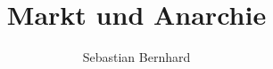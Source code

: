 \documentclass[a4paper]{hitec}
\begin{document}
\author{Sebastian Bernhard}
\title{Markt und Anarchie}
\maketitle
\tableofcontents













 
\printglossaries{}
\end{document}
